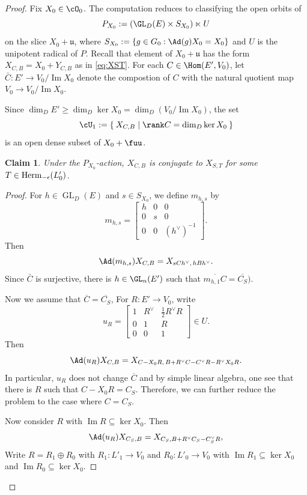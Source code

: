 \documentclass[11pt,a4paper]{amsart}
\def\Im{\operatorname{Im}}
\numberwithin{equation}{section}
\newtheorem{claim}[thm]{Claim}
\theoremstyle{remark}
\def\subset{\subseteq}
\begin{document}
\begin{proof}
Fix $X_0\in\cO_0$.  The computation reduces to classifying the open orbits of
\[
P_{X_0}:=(\GL_D(E)\times S_{X_0})\ltimes U
\]
on the slice $X_0+\mathfrak u$, where $S_{X_0}:=\{g\in G_0:\Ad(g) X_0 =X_0\}$ and $U$ is the unipotent radical of $P$.
Recall that element of $X_0+\mathfrak u$ has the form $X_{C,B}=X_0+Y_{C,B}$ as in \eqref{eq:XST}.
For each $C \in \Hom(E', V_0)$, let 
$\bar C:E'\to V_0/\Im X_0$ denote the compostion of $C$ with the natural quotient map $V_0 \to V_0/\Im X_0$.

Since $\dim_D E' \geq \dim_D \ker X_0 = \dim_D (V_0/\Im X_0)$,
the set 
\[
\cU_1 := \Set{X_{C,B} | \rank C  = \dim_D\ker X_0}
\]
is an open dense subset of $X_0 + \fuu$.  

\begin{claim}
  Under the $P_{X_0}$-action, $X_{C,B}$ is conjugate to 
  $X_{S,T}$ for some $T\in \mathrm{Herm}_{-\epsilon}(L'_0)$.   
\end{claim}
\begin{proof}
For $h\in\operatorname{GL}_D(E)$ and $s\in S_{X_0}$, we define $m_{h,s}$ by
$$
m_{h,s}=
\begin{bmatrix}
h&0&0\\
0&s&0\\
0&0&(h^\vee)^{-1}
\end{bmatrix}.
$$
Then 
\begin{equation}\label{eq:maction}
\Ad(m_{h,s})X_{C,B}
=X_{sC h^\vee,\,hBh^\vee}.                         
\end{equation}
Since $\bar C$ is surjective, there is $h\in \GL_n(E')$ such that  $\overline{m_{h,1} C}=\overline{C_S})$. 


Now we assume that $\overline{C}=\overline{C_S}$,
For $R:E'\to V_0$, write
\[
u_R=
\begin{bmatrix}
1&R^\vee&\frac12R^\vee R\\
0&1&R\\
0&0&1
\end{bmatrix}\in U.
\]
Then
$$
\Ad(u_R)X_{C,B}
=X_{C-X_0R,\,B+R^\vee C-C^\vee R-R^\vee X_0R}.      
$$
In particular, $u_R$ does not change $\overline C$ and by simple linear algebra, one see that there is $R$ such that $C - X_0R  = C_S$.
Therefore, we can further reduce the problem to the case where $C=C_S$.

Now consider $R$ with $ \Im R \subset\ker X_0$.
Then
$$
\Ad(u_R) X_{C_S,B}=X_{C_S,B+R^\vee C_S-C_S^\vee R},
$$
Write
$R=R_1\oplus R_0$ with $R_1:L'_1\to V_0$ and $R_0:L'_0\to V_0$ with $\Im R_1 \subset \ker X_0$ and $\Im R_0\subset\ker X_0$.



\end{proof}
\end{proof}
\end{document}
